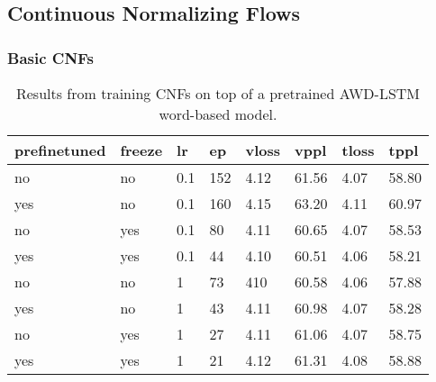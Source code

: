 \subsection{Continuous Normalizing Flows}


\subsubsection{Basic CNFs}

\begin{table}[]
\centering
\caption{Results from training CNFs on top of a pretrained AWD-LSTM word-based model.}
\begin{tabular}{|l|l|l|l|l|l|l|l|}
\hline
\textbf{prefinetuned} & \textbf{freeze} & \textbf{lr} & \textbf{ep} & \textbf{vloss} & \textbf{vppl} & \textbf{tloss} & \textbf{tppl}  \\ \hline
no        & no        & 0.1       & 152       & 4.12      & 61.56     & 4.07      & 58.80 \\ \hline
yes       & no        & 0.1       & 160       & 4.15      & 63.20     & 4.11      & 60.97 \\ \hline
no        & yes       & 0.1       & 80        & 4.11      & 60.65     & 4.07      & 58.53 \\ \hline
yes       & yes       & 0.1       & 44        & 4.10      & 60.51     & 4.06      & 58.21 \\ \hline
no        & no        & 1         & 73        & 410       & 60.58     & 4.06      & 57.88 \\ \hline
yes       & no        & 1         & 43        & 4.11      & 60.98     & 4.07      & 58.28 \\ \hline
no        & yes       & 1         & 27        & 4.11      & 61.06     & 4.07      & 58.75 \\ \hline
yes       & yes       & 1         & 21        & 4.12      & 61.31     & 4.08      & 58.88 \\ \hline

\end{tabular}
\end{table}


